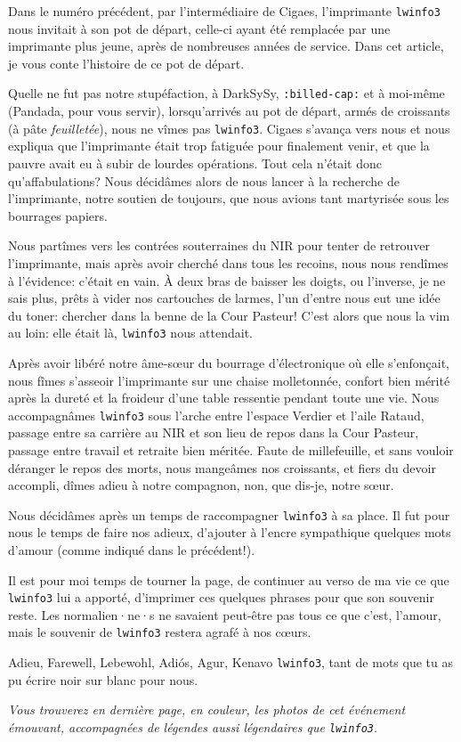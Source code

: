 
Dans le numéro précédent, par l'intermédiaire de Cigaes, l'imprimante {\tt lwinfo3} nous invitait à son pot de départ,
celle-ci ayant été remplacée par une imprimante plus jeune, après de nombreuses années de service. Dans cet article, je
vous conte l'histoire de ce pot de départ.

Quelle ne fut pas notre stupéfaction, à DarkSySy, {\tt :billed-cap:} et à moi-même (Pandada, pour vous servir), lorsqu'arrivés au pot de
départ, armés de croissants (à pâte {\it feuilletée}), nous ne vîmes pas {\tt lwinfo3}. 
Cigaes s'avança vers nous et nous expliqua que l'imprimante était trop fatiguée pour finalement venir, et que la pauvre avait eu à subir de lourdes opérations. 
Tout cela n'était donc qu'affabulations? 
Nous décidâmes alors de nous lancer à la recherche de l'imprimante, notre soutien de toujours, que nous avions tant martyrisée sous les bourrages papiers.

Nous partîmes vers les contrées souterraines du NIR pour tenter de retrouver l'imprimante, mais après avoir cherché dans
tous les recoins, nous nous rendîmes à l'évidence: c'était en vain. À deux bras de baisser les doigts, ou l'inverse, je
ne sais plus, prêts à vider nos cartouches de larmes, l'un d'entre nous eut une idée du toner: chercher dans la benne de
la Cour Pasteur! C'est alors que nous la vim au loin: elle était là, {\tt lwinfo3} nous attendait.

Après avoir libéré notre âme-s\oe{}ur du bourrage d'électronique où elle s'enfonçait, nous fîmes s'asseoir l'imprimante
sur une chaise molletonnée, confort bien mérité après la dureté et la froideur d'une table ressentie pendant toute une
vie. Nous accompagnâmes {\tt lwinfo3} sous l'arche entre l'espace Verdier et l'aile Rataud, passage entre sa carrière au
NIR et son lieu de repos dans la Cour Pasteur, passage entre travail et retraite bien méritée. Faute de millefeuille, et
sans vouloir déranger le repos des morts, nous mangeâmes nos croissants, et fiers du devoir accompli, dîmes adieu à
notre compagnon, non, que dis-je, notre s\oe{}ur.

Nous décidâmes après un temps de raccompagner {\tt lwinfo3} à sa place. Il fut pour nous le temps de faire nos adieux,
d'ajouter à l'encre sympathique quelques mots d'amour (comme indiqué dans le \BOcal{} précédent!).

Il est pour moi temps de tourner la page, de continuer au verso de ma vie ce que {\tt lwinfo3} lui a apporté, d'imprimer
ces quelques phrases pour que son souvenir reste. Les normalien·ne·s ne savaient peut-être pas tous ce que c'est, l'amour,
mais le souvenir de {\tt lwinfo3} restera agrafé à nos c\oe{}urs.

Adieu, Farewell, Lebewohl, %
Adiós, Agur, Kenavo {\tt lwinfo3}, tant de mots que tu as pu écrire noir sur
blanc pour nous. 

\signature{Pandada, DarkSySy, {\tt :billed-cap:}}

\emph{Vous trouverez en dernière page, en couleur, les photos de cet événement émouvant,
accompagnées de légendes aussi légendaires que
\texttt{lwinfo3}}.

